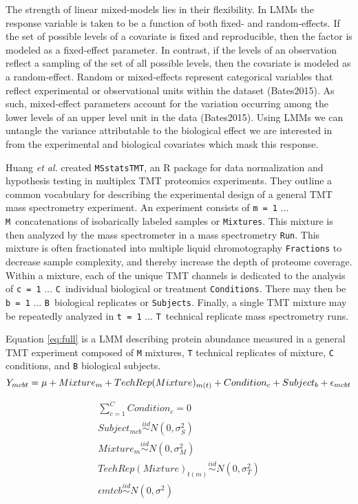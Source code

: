 \documentclass[11pt]{elife}
\begin{document}
The strength of linear mixed-models lies in their flexibility. In LMMs 
the response variable is taken to be a function of both fixed- and random-effects. 
If the set of possible levels of a covariate is fixed and reproducible, then the
factor is modeled as a fixed-effect parameter.  In contrast, if the levels of an
observation reflect a sampling of the set of all possible levels, then the
covariate is modeled as a random-effect.  Random or mixed-effects represent
categorical variables that reflect experimental or observational units within
the dataset (Bates2015).  As such, mixed-effect parameters account for the
variation occurring among the lower levels of an upper level unit in the data
(Bates2015).  Using LMMs we can untangle the variance attributable to the
biological effect we are interested in from the experimental and biological
covariates which mask this response.

Huang \textit{et al.} created \texttt{MSstatsTMT}, an R package for data
normalization and hypothesis testing in multiplex TMT proteomics experiments. 
They outline a common vocabulary for describing the experimental design of 
a general TMT mass spectrometry experiment. An experiment consists of 
\texttt{m = 1} ... \texttt{M}\ concatenations of isobarically labeled samples or
\texttt{Mixtures}.  This mixture is then analyzed by the mass spectrometer in a
mass spectrometry \texttt{Run}.  This mixture is often fractionated into
multiple liquid chromotography \texttt{Fractions} to decrease sample complexity,
and thereby increase the depth of proteome coverage.  Within a mixture, each of
the unique TMT channels is dedicated to the analysis of \texttt{c = 1} ...
\texttt{C}\ individual biological or treatment \texttt{Conditions}.  There may
then be \texttt{b = 1} ... \texttt{B}\ biological replicates or
\texttt{Subjects}. Finally, a single TMT mixture may be repeatedly analyzed in
\texttt{t = 1} ... \texttt{T}\ technical replicate mass spectrometry runs.

Equation \ref{eq:full} is a LMM describing protein abundance measured in a general TMT
experiment composed of  \texttt{M} mixtures, \texttt{T} technical replicates of
mixture, \texttt{C} conditions, and \texttt{B} biological subjects.
\begin{equation} %
  \label{eq:full} 
	Y_{mcbt} = \mu + Mixture_m + TechRep(Mixture)_{m(t)} + Condition_c + 
	Subject_b + \epsilon_{mcbt}\\
\end{equation}

\begin{equation}
  \begin{gathered}
    \label{eq:constraints}
	\sum_{c=1}^{C} Condition_c = 0 \\
	Subject_{mcb} \stackrel{iid}{\sim} N(0,\sigma^2_S) \\
	Mixture_m \stackrel{iid}{\sim} N(0,\sigma^2_M) \\
	TechRep(Mixture)_{t(m)} \stackrel{iid}{\sim} N(0,\sigma^2_T) \\
	\epsilon{mtcb} \stackrel{iid}{\sim} N(0,\sigma^2) \\
  \end{gathered}
\end{equation}
\end{document}
